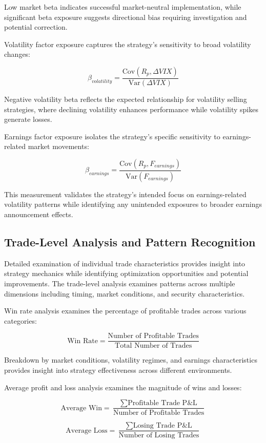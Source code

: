 \documentclass[
  american,
  11pt,
  11pt,
  letterpaper,
  onecolumn]{article}
\begin{document}
Low market beta indicates successful market-neutral implementation,
while significant beta exposure suggests directional bias requiring
investigation and potential correction.

Volatility factor exposure captures the strategy's sensitivity to broad
volatility changes:

\[\beta_{volatility} = \frac{\text{Cov}(R_p, \Delta VIX)}{\text{Var}(\Delta VIX)}\]

Negative volatility beta reflects the expected relationship for
volatility selling strategies, where declining volatility enhances
performance while volatility spikes generate losses.

Earnings factor exposure isolates the strategy's specific sensitivity to
earnings-related market movements:

\[\beta_{earnings} = \frac{\text{Cov}(R_p, F_{earnings})}{\text{Var}(F_{earnings})}\]

This measurement validates the strategy's intended focus on
earnings-related volatility patterns while identifying any unintended
exposures to broader earnings announcement effects.

\subsection{Trade-Level Analysis and Pattern
Recognition}\label{trade-level-analysis-and-pattern-recognition}

Detailed examination of individual trade characteristics provides
insight into strategy mechanics while identifying optimization
opportunities and potential improvements. The trade-level analysis
examines patterns across multiple dimensions including timing, market
conditions, and security characteristics.

Win rate analysis examines the percentage of profitable trades across
various categories:

\[\text{Win Rate} = \frac{\text{Number of Profitable Trades}}{\text{Total Number of Trades}}\]

Breakdown by market conditions, volatility regimes, and earnings
characteristics provides insight into strategy effectiveness across
different environments.

Average profit and loss analysis examines the magnitude of wins and
losses:

\[\text{Average Win} = \frac{\sum \text{Profitable Trade P\&L}}{\text{Number of Profitable Trades}}\]

\[\text{Average Loss} = \frac{\sum \text{Losing Trade P\&L}}{\text{Number of Losing Trades}}\]
\end{document}
